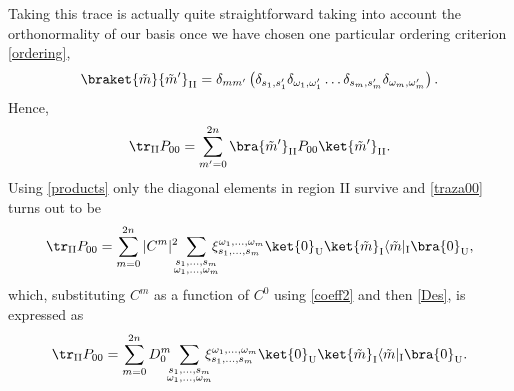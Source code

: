 Taking this trace is actually quite straightforward taking into account the orthonormality of our basis once we have chosen one particular ordering criterion \eqref{ordering}, 
\begin{equation}\label{products}
\braket{\tilde m}{\tilde m'}_\text{II}=\delta_{mm'}\left(\delta_{s_1,s'_1}\delta_{\omega_1,\omega'_1}\dots\delta_{s_m,s'_m}\delta_{\omega_m,\omega'_m}\right).
\end{equation} 
Hence,
\begin{equation}\label{traza00}
\tr_{\text{II}} P_{00}=\sum_{m'=0}^{2n}\bra{\tilde m'}_\text{II}P_{00}\ket{\tilde m'}_\text{II}.
\end{equation}
Using \eqref{products} only the diagonal elements in region II survive and \eqref{traza00} turns out to be
\begin{equation}\label{t00pre}
\tr_{\text{II}} P_{00}=\sum_{m=0}^{2n}|C^m|^2 \!\!\!\sum_{\substack{s_1,\dots,s_m\\\omega_1,\dots,\omega_m}}\!\!\!\!\xi_{s_1,\dots,s_m}^{\omega_1,\dots,\omega_m}\ket{0}_{\text{U}}\ket{\tilde m}_{\text{I}}\langle{\tilde m}|_{\text{I}}\bra{0}_{\text{U}},
\end{equation}
which, substituting $C^m$ as a function of $C^0$ using \eqref{coeff2} and then \eqref{Des}, is expressed as
\begin{equation}\label{t00}
\tr_{\text{II}} P_{00}=\sum_{m=0}^{2n}D_0^m \!\!\!\sum_{\substack{s_1,\dots,s_m\\\omega_1,\dots,\omega_m}}\!\!\!\!\xi_{s_1,\dots,s_m}^{\omega_1,\dots,\omega_m}\ket{0}_{\text{U}}\ket{\tilde m}_{\text{I}}\langle{\tilde m}|_{\text{I}}\bra{0}_{\text{U}}.
\end{equation}

